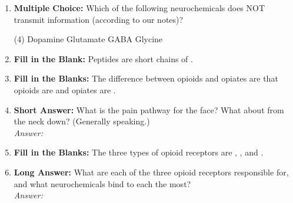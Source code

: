 \begin{enumerate}[label=\textbf{Q3.2.\arabic*}]
    \item \textbf{Multiple Choice:} Which of the following neurochemicals does NOT transmit information (according to our notes)?
        \begin{tasks}[label=\textcolor{\documentTheme}{(\Alph*)}, item-format=\color{\documentTheme}, label-width=1.5em, item-indent=1.7em](4)
            \task Dopamine
            \task Glutamate
            \task GABA
            \task Glycine
        \end{tasks}

    \item \textbf{Fill in the Blank:} Peptides are short chains of \underline{\hspace{3cm}}.

    \item \textbf{Fill in the Blanks:} The difference between opioids and opiates are that opioids are \underline{\hspace{3cm}} and opiates are \underline{\hspace{3cm}}.

    \item \textbf{Short Answer:} What is the pain pathway for the face? What about from the neck down? (Generally speaking.) \\
        \textit{Answer:} \\%

    \item \textbf{Fill in the Blanks:} The three types of opioid receptors are \underline{\hspace{3cm}}, \underline{\hspace{3cm}}, and \underline{\hspace{3cm}}.

    \item \textbf{Long Answer:} What are each of the three opioid receptors responsible for, and what neurochemicals bind to each the most? \\
        \textit{Answer:} \\[1cm] %


\end{enumerate}
